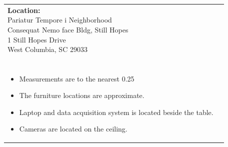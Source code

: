 \documentclass[12pt]{article}
\begin{document}
    \vspace*{\fill}  %
    \begin{table}[H]
	\begin{tabular}{l l}
		\makecell[lt]{
			\textbf{Location:}\\
     		Pariatur Tempore i Neighborhood \\
 		    Consequat Nemo face Bldg, Still Hopes\\
           	1 Still Hopes Drive\\
           	West Columbia, SC 29033\\\\
        }   	
        &	
		\makecell[tp{5in}]{
		\textbf{Notes:}\\
		\vspace{-8mm}  %
		\begin{itemize}
			\setlength\itemsep{-3mm}  %
			\item Measurements are to the nearest \SI{0.25}{\inch}
			\item The furniture locations are approximate.
			\item Laptop and data acquisition system is located beside the table.
			\item Cameras are located on the ceiling.
		\end{itemize}
		}	
			
	\end{tabular}
	\vspace{-8mm} %
\end{table}

    
\end{document}
